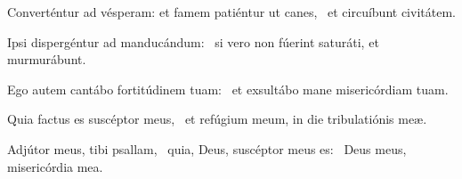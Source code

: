 \item Converténtur ad vésperam: et famem patiéntur ut canes,~\psstar{} et circuíbunt civitátem.

\item Ipsi dispergéntur ad mandu\-cándum:~\psstar{} si vero non fúerint saturáti, et murmurábunt.

\item Ego autem cantábo fortitúdinem tuam:~\psstar{} et exsultábo mane misericórdiam tuam.

\item Quia factus es suscéptor meus,~\psstar{} et refúgium meum, in die tribulatiónis meæ.

\item Adjútor meus, tibi psallam,~\pscross{} quia, Deus, suscéptor meus es:~\psstar{} Deus meus, misericórdia mea.

